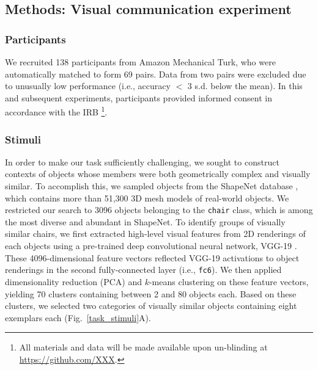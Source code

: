 \documentclass[10pt,letterpaper]{article}
\begin{document}
\subsection{Methods: Visual communication experiment}

\subsubsection{Participants} We recruited 138 participants from Amazon Mechanical Turk, who were automatically matched to form 69 pairs.
Data from two pairs were excluded due to unusually low performance (i.e., accuracy $<$ 3 s.d. below the mean). In this and subsequent experiments, participants provided informed consent in accordance with the IRB%
\footnote{ All materials and data will be made available upon un-blinding at \url{https://github.com/XXX}.}.

\subsubsection{Stimuli}

In order to make our task sufficiently challenging, we sought to construct contexts of objects whose members were both geometrically complex and visually similar.
To accomplish this, we sampled objects from the ShapeNet database \cite{chang2015shapenet}, which contains more than 51,300 3D mesh models of real-world objects. %
We restricted our search to 3096 objects belonging to the \texttt{chair} class, which is among the most diverse and abundant in ShapeNet.
To identify groups of visually similar chairs, we first extracted high-level visual features from 2D renderings of each objects using a pre-trained deep convolutional neural network, VGG-19 \cite{simonyan2014very}.
These 4096-dimensional feature vectors reflected VGG-19 activations to object renderings in the second fully-connected layer (i.e., \texttt{fc6}).
We then applied dimensionality reduction (PCA) and $k$-means clustering on these feature vectors, yielding 70 clusters containing between 2 and 80 objects each.
Based on these clusters, we selected two categories of visually similar objects containing eight exemplars each (Fig.~\ref{task_stimuli}A).
\end{document}
